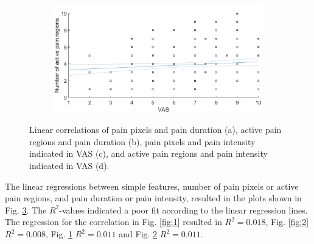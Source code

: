 \begin{figure} [t!]
\begin{subfigure}[b]{0.51\textwidth}
    \caption{}
    \label{fig:3}
  \end{subfigure}
  \hfill
  \hspace{2mm}
  \begin{subfigure}[b]{0.51\textwidth}
    \includegraphics[width=\textwidth]{Figures/vasregion}
       \caption{ }
    \label{fig:4}
  \end{subfigure}  
  \caption{Linear correlations of pain pixels and pain duration (a), active pain regions and pain duration (b), pain pixels and pain intensity indicated in VAS (c), and active pain regions and pain intensity indicated in VAS (d).}
  \label{fig:correlations}
\end{figure}

The linear regressions between simple features, number of pain pixels or active pain regions, and pain duration or pain intensity, resulted in the plots shown in Fig. \ref{fig:correlations}. The $R^2$-values indicated a poor fit according to the linear regression lines. The regression for the correlation in Fig. \ref{fig:1} resulted in $R^2 = 0.018$, Fig. \ref{fig:2} $R^2 = 0.008$, Fig. \ref{fig:3} $R^2 = 0.011$ and Fig. \ref{fig:4} $R^2 = 0.011$. 

